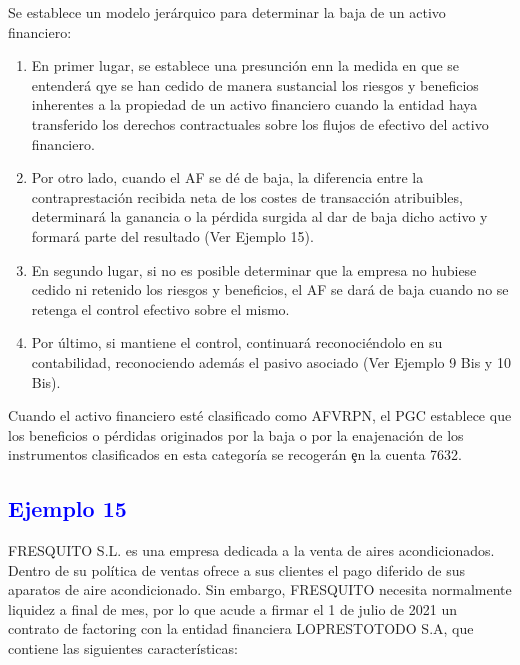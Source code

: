 Se establece un modelo jerárquico para determinar la baja de un activo financiero:
\begin{enumerate}
    \item En primer lugar, se establece una presunción enn la medida en que se entenderá qye se han cedido de manera sustancial los riesgos y beneficios inherentes a la propiedad de un activo financiero cuando la entidad haya transferido los derechos contractuales sobre los flujos de efectivo del activo financiero.
    \item Por otro lado, cuando el AF se dé de baja, la diferencia entre la contraprestación recibida neta de los costes de transacción atribuibles, determinará la ganancia o la pérdida surgida al dar de baja dicho activo y formará parte del resultado (Ver Ejemplo 15).
    \item En segundo lugar, si no es posible determinar que la empresa no hubiese cedido ni retenido los riesgos y beneficios, el AF se dará de baja cuando no se retenga el control efectivo sobre el mismo.
    \item Por último, si mantiene el control, continuará reconociéndolo en su contabilidad, reconociendo además el pasivo asociado (Ver Ejemplo 9 Bis y 10 Bis). 
\end{enumerate}

Cuando el activo financiero esté clasificado como AFVRPN, el PGC establece que los beneficios o pérdidas originados por la baja o por la enajenación de los instrumentos clasificados en esta categoría se recogerán \c{en la cuenta 7632}.

\subsection*{\textcolor{blue}{Ejemplo 15}}

FRESQUITO S.L. es una empresa dedicada a la venta de aires acondicionados. Dentro de su política de ventas ofrece a sus clientes el pago diferido de sus aparatos de aire acondicionado. Sin embargo, FRESQUITO necesita normalmente liquidez a final de mes, por lo que acude a firmar el 1 de julio de 2021 un contrato de factoring con la entidad financiera LOPRESTOTODO S.A, que contiene las siguientes características:

